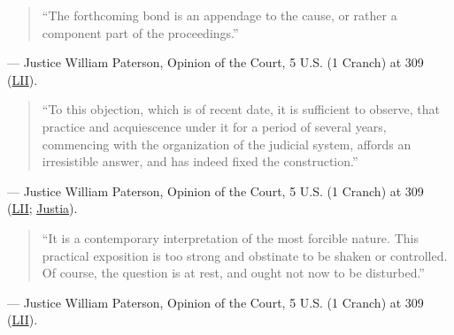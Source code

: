 \documentclass[12pt]{article}
\begin{document}
\begin{quote}
``The forthcoming bond is an appendage to the cause, or rather a component part of the proceedings.''
\end{quote}
\noindent --- Justice William Paterson, Opinion of the Court, 5 U.S. (1 Cranch) at 309 (\href{https://www.law.cornell.edu/supremecourt/text/5/299}{LII}).

\begin{quote}
``To this objection, which is of recent date, it is sufficient to observe, that practice and acquiescence under it for a period of several years, commencing with the organization of the judicial system, affords an irresistible answer, and has indeed fixed the construction.''
\end{quote}
\noindent --- Justice William Paterson, Opinion of the Court, 5 U.S. (1 Cranch) at 309 (\href{https://www.law.cornell.edu/supremecourt/text/5/299}{LII}; \href{https://supreme.justia.com/cases/federal/us/5/299/}{Justia}).

\begin{quote}
``It is a contemporary interpretation of the most forcible nature. This practical exposition is too strong and obstinate to be shaken or controlled. Of course, the question is at rest, and ought not now to be disturbed.''
\end{quote}
\noindent --- Justice William Paterson, Opinion of the Court, 5 U.S. (1 Cranch) at 309 (\href{https://www.law.cornell.edu/supremecourt/text/5/299}{LII}).
\end{document}
